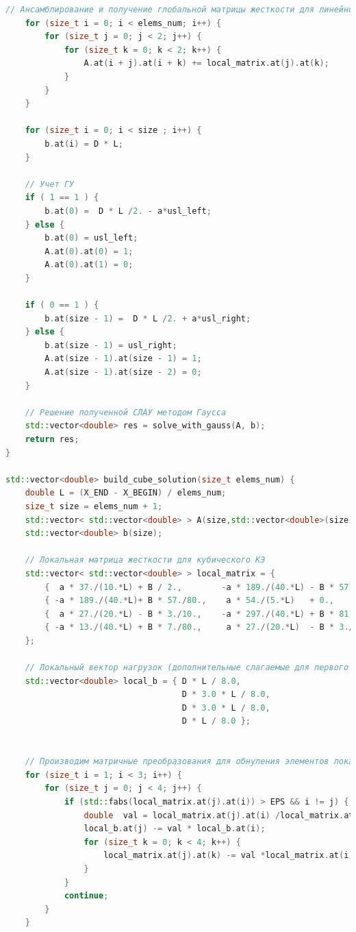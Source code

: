\begin{lstlisting}[language=c++, label=prog,caption={\textit{Реализация МКЭ}}]
    // Ансамблирование и получение глобальной матрицы жесткости для линейного КЭ
    for (size_t i = 0; i < elems_num; i++) {
        for (size_t j = 0; j < 2; j++) {
            for (size_t k = 0; k < 2; k++) {
                A.at(i + j).at(i + k) += local_matrix.at(j).at(k);
            }
        }
    }

    for (size_t i = 0; i < size ; i++) {
        b.at(i) = D * L;
    }

    // Учет ГУ
    if ( 1 == 1 ) {
        b.at(0) =  D * L /2. - a*usl_left;
    } else {
        b.at(0) = usl_left;
        A.at(0).at(0) = 1;
        A.at(0).at(1) = 0;
    }

    if ( 0 == 1 ) {
        b.at(size - 1) =  D * L /2. + a*usl_right;
    } else {
        b.at(size - 1) = usl_right;
        A.at(size - 1).at(size - 1) = 1;
        A.at(size - 1).at(size - 2) = 0;
    }

    // Решение полученной СЛАУ методом Гаусса
    std::vector<double> res = solve_with_gauss(A, b);
    return res;
}

std::vector<double> build_cube_solution(size_t elems_num) {
    double L = (X_END - X_BEGIN) / elems_num;
    size_t size = elems_num + 1;
    std::vector< std::vector<double> > A(size,std::vector<double>(size));
    std::vector<double> b(size);
    
    // Локальная матрица жесткости для кубического КЭ
    std::vector< std::vector<double> > local_matrix = {
        {  a * 37./(10.*L) + B / 2.,        -a * 189./(40.*L) - B * 57./80.,    a * 27./(20.*L)   + B * 3./10.,    -a * 13./(40.*L)   - B * 7./80. },
        { -a * 189./(40.*L)+ B * 57./80.,    a * 54./(5.*L)   + 0.,            -a * 297./(40.*L)  - B * 81./80.,    a * 27./(20.*L)   + B * 3./10. },
        {  a * 27./(20.*L) - B * 3./10.,    -a * 297./(40.*L) + B * 81./80.,    a * 54./(5.*L)    - 0.,            -a * 189./(40.*L)  - B * 57./80.},
        { -a * 13./(40.*L) + B * 7./80.,     a * 27./(20.*L)  - B * 3./10.,    -a * 189./(40.*L)  + B * 57./80.,    a * 37./(10.*L)   - B * 1./2.}
    };
    
    // Локальный вектор нагрузок (дополнительные слагаемые для первого и последнего элементов учитываются далее)
    std::vector<double> local_b = { D * L / 8.0,
                                    D * 3.0 * L / 8.0,
                                    D * 3.0 * L / 8.0,
                                    D * L / 8.0 };

    
    // Производим матричные преобразования для обнуления элементов локальной матрицы жесткости, относящихся к внутренним узлам
    for (size_t i = 1; i < 3; i++) {
        for (size_t j = 0; j < 4; j++) {
            if (std::fabs(local_matrix.at(j).at(i)) > EPS && i != j) {
                double  val = local_matrix.at(j).at(i) /local_matrix.at(i).at(i);
                local_b.at(j) -= val * local_b.at(i);
                for (size_t k = 0; k < 4; k++) {
                    local_matrix.at(j).at(k) -= val *local_matrix.at(i).at(k);
                }
            }
            continue;
        }
    }
    

\end{lstlisting}
